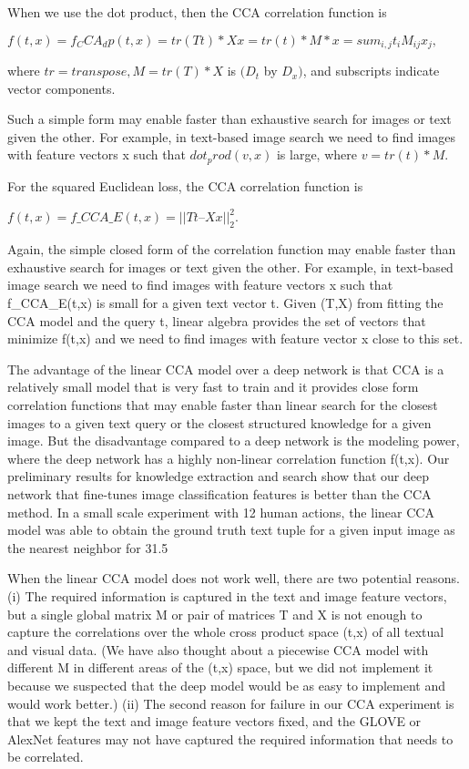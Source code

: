 \documentclass[runningheads]{llncs}
\begin{document}
When we use the dot product, then the CCA correlation function is


$f(t,x) = f_CCA_dp(t,x) = tr(Tt) * Xx = tr(t)*M*x = sum_{i,j} t_i M_{ij} x_j,$


where $tr=transpose, M=tr(T)*X$ is $(D_t$ by $D_x)$, and subscripts indicate vector components.


Such a simple form may enable faster than exhaustive search for images or text given the other. For example, in text-based image search we need to find images with feature vectors x such that $dot_prod(v,x)$ is large, where $v=tr(t)*M$.


For the squared Euclidean loss, the CCA correlation function is


$f(t,x) = f\_CCA\_E(t,x) = ||T t – X x||_2^2$.


Again, the simple closed form of the correlation function may enable faster than exhaustive search for images or text given the other. For example, in text-based image search we need to find images with feature vectors x such that f\_CCA\_E(t,x) is small for a given text vector t. Given (T,X) from fitting the CCA model and the query t, linear algebra provides the set of vectors that minimize f(t,x) and we need to find images with feature vector x close to this set.


The advantage of the linear CCA model over a deep network is that CCA is a relatively small model that is very fast to train and it provides close form correlation functions that may enable faster than linear search for the closest images to a given text query or the closest structured knowledge for a given image. But the disadvantage compared to a deep network is the modeling power, where the deep network has a highly non-linear correlation function f(t,x). Our preliminary results for knowledge extraction and search show that our deep network that fine-tunes image classification features is better than the CCA method. In a small scale experiment with 12 human actions, the linear CCA model was able to obtain the ground truth text tuple for a given input image as the nearest neighbor for 31.5%


When the linear CCA model does not work well, there are two potential reasons. (i) The required information is captured in the text and image feature vectors, but a single global matrix M or pair of matrices T and X is not enough to capture the correlations over the whole cross product space (t,x) of all textual and visual data. (We have also thought about a piecewise CCA model with different M in different areas of the (t,x) space, but we did not implement it because we suspected that the deep model would be as easy to implement and would work better.) (ii) The second reason for failure in our CCA experiment is that we kept the text and image feature vectors fixed, and the GLOVE or AlexNet features may not have captured the required information that needs to be correlated.
\end{document}
